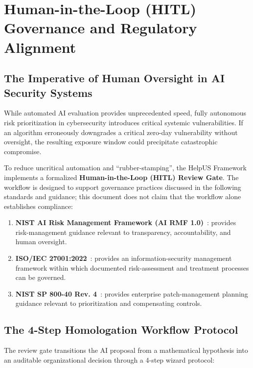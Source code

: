 \chapter{Human-in-the-Loop (HITL) Governance and Regulatory Alignment}
\label{chap:hitl_governance}

\section{The Imperative of Human Oversight in AI Security Systems}
While automated AI evaluation provides unprecedented speed, fully autonomous risk prioritization in cybersecurity introduces critical systemic vulnerabilities. If an algorithm erroneously downgrades a critical zero-day vulnerability without oversight, the resulting exposure window could precipitate catastrophic compromise.

To reduce uncritical automation and ``rubber-stamping'', the HelpUS Framework implements a formalized \textbf{Human-in-the-Loop (HITL) Review Gate}. The workflow is designed to support governance practices discussed in the following standards and guidance; this document does not claim that the workflow alone establishes compliance:
\begin{enumerate}
    \item \textbf{NIST AI Risk Management Framework (AI RMF 1.0)}~\cite{nist_ai_rmf}: provides risk-management guidance relevant to transparency, accountability, and human oversight.
    \item \textbf{ISO/IEC 27001:2022}~\cite{iso27001_2022}: provides an information-security management framework within which documented risk-assessment and treatment processes can be governed.
    \item \textbf{NIST SP 800-40 Rev. 4}~\cite{nist_sp80040}: provides enterprise patch-management planning guidance relevant to prioritization and compensating controls.
\end{enumerate}

\section{The 4-Step Homologation Workflow Protocol}
The review gate transitions the AI proposal from a mathematical hypothesis into an auditable organizational decision through a 4-step wizard protocol:

